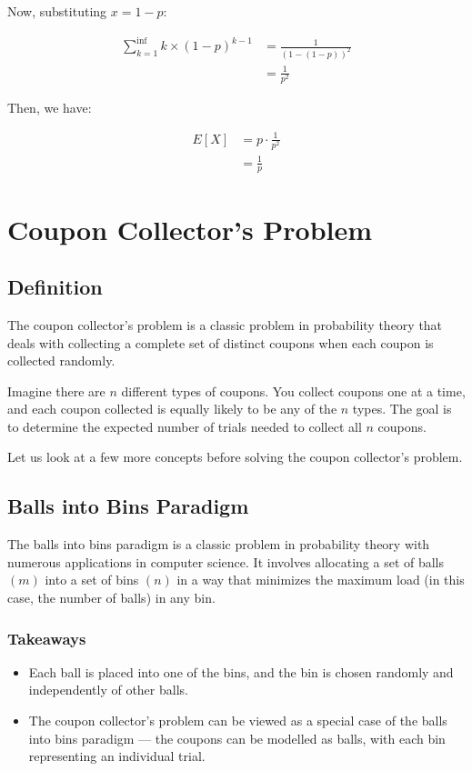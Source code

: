         Now, substituting \(x = 1 - p\):

        \[
            \begin{aligned}
                \sum_{k = 1}^{\inf} k \times (1 - p)^{k - 1} & = \frac{1}{(1 - (1 - p))^2}\\
                & = \frac{1}{p^2}
            \end{aligned}
        \]

        Then, we have:

        \[
            \begin{aligned}
                E[X] & = p \cdot \frac{1}{p^2}\\
                & = \frac{1}{p}
            \end{aligned}
        \]

\section*{Coupon Collector's Problem}
    \subsection*{Definition}
        The coupon collector's problem is a classic problem in probability theory that deals with collecting a complete set of distinct coupons when each coupon is collected randomly.

        Imagine there are \(n\) different types of coupons. You collect coupons one at a time, and each coupon collected is equally likely to be any of the \(n\) types. The goal is to determine the expected number of trials needed to collect all \(n\) coupons.

        Let us look at a few more concepts before solving the coupon collector's problem.

    \subsection*{Balls into Bins Paradigm}
        The balls into bins paradigm is a classic problem in probability theory with numerous applications in computer science. It involves allocating a set of balls \((m)\) into a set of bins \((n)\) in a way that minimizes the maximum load (in this case, the number of balls) in any bin.

        \subsubsection*{Takeaways}
            \begin{itemize}
                \item Each ball is placed into one of the bins, and the bin is chosen randomly and independently of other balls.

                \item The coupon collector's problem can be viewed as a special case of the balls into bins paradigm --- the coupons can be modelled as balls, with each bin representing an individual trial.
            \end{itemize}

